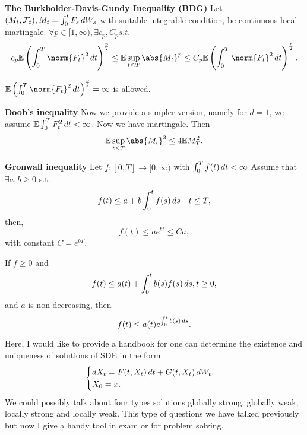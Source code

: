 \textbf{The Burkholder-Davis-Gundy Inequality (BDG)}
Let $(M_t, \mathcal{F}_t), M_t = \int_0^t F_s \mathop{}\!d W_s$ with suitable integrable condition, be continuous local martingale. $\forall p \in [1, \infty), \exists c_p, C_p s.t.$
\begin{equation*}
   c_p \E\left( \int_0^T \norm{F_t}^2 \diff t \right)^\frac{p}{2} \leq \E\sup_{t\leq T} \abs{M_t}^p \leq C_p \E\left( \int_0^T \norm{F_t}^2 \diff t \right)^\frac{p}{2}.
\end{equation*}

\begin{rem}
$\E\left( \int_0^T \norm{F_t}^2 \diff t \right)^\frac{p}{2} = \infty$ is allowed.
\end{rem}
\textbf{Doob's inequality} Now we provide a simpler version, namely for $d=1$, we assume $\mathbb{E}\int_0^T F_t^2  \mathop{}\!d t < \infty$. Now we have martingale. Then
\begin{equation*}
    \E\sup_{t\leq T} \abs{M_t}^2 \leq 4\E M_T^2.
\end{equation*}

\textbf{Gronwall inequality} Let $f:[0,T] \rightarrow [0,\infty)$ with $\int_0^T f(t) \mathop{}\!d t < \infty$ Assume that $\exists a,b\geq 0$ s.t.
\begin{equation*}
    f(t) \leq a + b\int_0^t f(s) \mathop{}\!d s \quad t\leq T,
\end{equation*}
then,
\begin{equation*}
    f(t) \leq a e^{bt} \leq  C a,
\end{equation*}
with constant $C = e^{bT}$.

\begin{cor}
If $f \geq 0$ and
\begin{equation*}
    f(t) \leq a(t) + \int_0^t b(s) f(s) \mathop{}\!d s, t\geq 0,
\end{equation*} and $a$ is non-decreasing, then
\begin{equation*}
    f(t) \leq a(t) e^{\int_0^t b(s) \mathop{}\!d s}.
\end{equation*}
\end{cor}

\newpage
Here, I would like to provide a handbook for one can determine the existence and uniqueness of solutions of SDE in the form
\begin{equation*}
    \begin{cases}
        \mathop{}\!d X_t = F(t, X_t) \mathop{}\!d t + G(t, X_t) \mathop{}\!d W_t,  \\
        X_0 = x.
    \end{cases}
\end{equation*}
We could possibly talk about four types solutions globally strong, globally weak, locally strong and locally weak. This type of questions we have talked previously but now I give a handy tool in exam or for problem solving.

